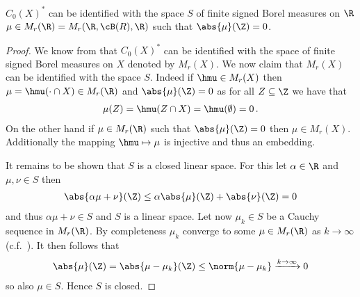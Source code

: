 \begin{claim}
$C_0(X)^*$ can be identified with the space $S$ of finite signed Borel measures on $\R$ $\mu\in M_r(\R)=M_r(\R,\cB(R),\R)$ such that $\abs{\mu}(\Z)=0$.
\end{claim}

\begin{proof}
We know from \cite[Theorem 7.3.6]{CohnMT} that $C_0(X)^*$ can be identified with the space of finite signed Borel measures on $X$ denoted by $M_r(X)$. We now claim that $M_r(X)$ can be identified with the space $S$. Indeed if $\hmu\in M_r(X)$ then $\mu=\hmu(\cdot\cap X)\in M_r(\R)$ and $\abs{\mu}(\Z)=0$ as for all $Z\subseteq\Z$ we have that
\begin{align*}
	\mu(Z)=\hmu(Z\cap X) =\hmu(\emptyset)=0\,.
\end{align*}
On the other hand if $\mu\in M_r(\R)$ such that $\abs{\mu}(\Z)=0$ then $\mu\in M_r(X)$. Additionally the mapping $\hmu\mapsto\mu$ is injective and thus an embedding.

It remains to be shown that $S$ is a closed linear space. For this let $\alpha\in\R$ and $\mu, \nu\in S$ then
\begin{align*}
	\abs{\alpha\mu+\nu}(\Z)\leq \alpha\abs{\mu}(\Z)+\abs{\nu}(\Z)=0
\end{align*}
and thus $\alpha\mu+\nu\in S$ and $S$ is a linear space. Let now $\mu_k\in S$ be a Cauchy sequence in $M_r(\R)$. By completeness $\mu_k$ converge to some $\mu\in M_r(\R)$ as $k\to\infty$ (c.f.\ \cite[Chapter 7.3]{CohnMT}). It then follows that
\begin{align*}
	\abs{\mu}(\Z)=\abs{\mu-\mu_k}(\Z)\leq \norm{\mu-\mu_k}\xrightarrow{k\to\infty}0
\end{align*}
so also $\mu\in S$. Hence $S$ is closed.
\end{proof}

